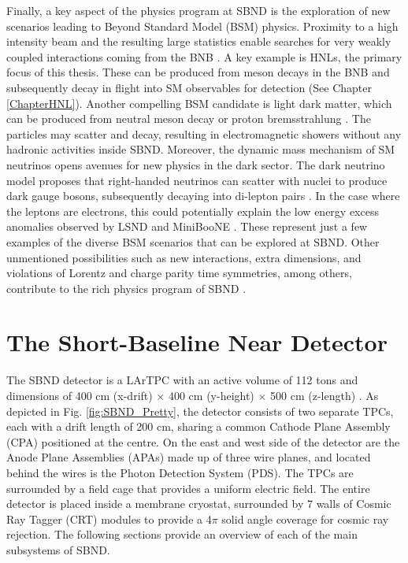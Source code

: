 Finally, a key aspect of the physics program at SBND is the exploration of new scenarios leading to Beyond Standard Model (BSM) physics. 
Proximity to a high intensity beam and the resulting large statistics enable searches for very weakly coupled interactions coming from the BNB \cite{SBNProgram}.
A key example is HNLs, the primary focus of this thesis.
These can be produced from meson decays in the BNB and subsequently decay in flight into SM observables for detection (See Chapter \ref{ChapterHNL}).
Another compelling BSM candidate is light dark matter, which can be produced from neutral meson decay or proton bremsstrahlung \cite{LightDarkMatter}. 
The particles may scatter and decay, resulting in electromagnetic showers without any hadronic activities inside SBND.
Moreover, the dynamic mass mechanism of SM neutrinos opens avenues for new physics in the dark sector. 
The dark neutrino model proposes that right-handed neutrinos can scatter with nuclei to produce dark gauge bosons, subsequently decaying into di-lepton pairs \cite{DarkNeutrino}. 
In the case where the leptons are electrons, this could potentially explain the low energy excess anomalies observed by LSND and MiniBooNE \cite{DarkNeutrinoLEE}.
These represent just a few examples of the diverse BSM scenarios that can be explored at SBND. 
Other unmentioned possibilities such as new interactions, extra dimensions, and violations of Lorentz and charge parity time symmetries, among others, contribute to the rich physics program of SBND \cite{SBNProgram}.

\section{The Short-Baseline Near Detector}
\label{sec4SBND}

The SBND detector is a LArTPC with an active volume of 112 tons and dimensions of 400 cm (x-drift) $\times$ 400 cm (y-height) $\times$ 500 cm (z-length) \cite{SBNProposal}.
As depicted in Fig. \ref{fig:SBND_Pretty}, the detector consists of two separate TPCs, each with a drift length of 200 cm, sharing a common Cathode Plane Assembly (CPA) positioned at the centre.
On the east and west side of the detector are the Anode Plane Assemblies (APAs) made up of three wire planes, and located behind the wires is the Photon Detection System (PDS).
The TPCs are surrounded by a field cage that provides a uniform electric field.
The entire detector is placed inside a membrane cryostat, surrounded by 7 walls of Cosmic Ray Tagger (CRT) modules to provide a 4$\pi$ solid angle coverage for cosmic ray rejection.
The following sections provide an overview of each of the main subsystems of SBND.


